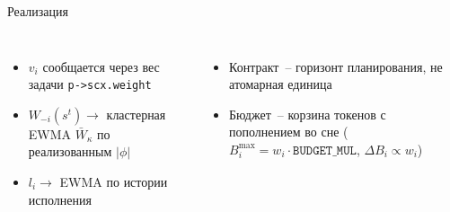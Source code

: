 \documentclass[aspectratio=169,11pt]{beamer}
\begin{document}
\begin{frame}{Реализация}
        \vspace{0.2em}
        \begin{columns}[T]
                {\footnotesize
                \begin{itemize}\setlength{\itemsep}{0pt}
                        \item $v_i$ сообщается через вес задачи
                                \texttt{p->scx.weight}
                        \item $W_{-i}(s^t) \to$ кластерная EWMA
                                $\bar W_\kappa$ по реализованным
                                $|\phi|$
                        \item $l_i \to$ EWMA по истории исполнения
                \end{itemize}}

                {\footnotesize
                \begin{itemize}\setlength{\itemsep}{0pt}
                        \item Контракт~-- горизонт планирования,
                                не атомарная единица
                        \item Бюджет~-- корзина токенов с
                                пополнением во сне
                                ($B_i^{\max} = w_i\cdot\texttt{BUDGET\_MUL}$,
                                $\Delta B_i \propto w_i$)
                \end{itemize}}
        \end{columns}
\end{frame}
\end{document}

